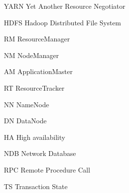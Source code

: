 \begin{basedescript}{\desclabelstyle{\pushlabel}\desclabelwidth{10em}}
\item[YARN] Yet Another Resource Negotiator
  \cite{Vavilapalli:2013:AHY:2523616.2523633}
\item[HDFS] Hadoop Distributed File System \cite{Shvachko:2010:HDF:1913798.1914427}
\item[RM] ResourceManager
\item[NM] NodeManager
\item[AM] ApplicationMaster
\item[RT] ResourceTracker
\item[NN] NameNode
\item[DN] DataNode
\item[HA] High availability
\item[NDB] Network Database
\item[RPC] Remote Procedure Call
\item[TS] Transaction State
\end{basedescript}